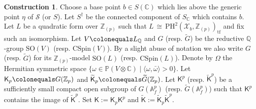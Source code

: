 \documentclass[11pt, letterpaper]{amsart}
\theoremstyle{plain}
\theoremstyle{definition}
\newtheorem{construction}[theorem]{Construction}
\newcommand{\IA}{\mathbb{A}}
\newcommand{\IC}{\mathbb{C}}
\newcommand{\IP}{\mathbb{P}}
\newcommand{\IQ}{\mathbb{Q}}
\newcommand{\IZ}{\mathbb{Z}}
\newcommand\iso{\,{\cong}\,}
\newcommand\tensor{{\otimes}}
\newcommand{\<}{\langle}
\renewcommand{\>}{\rangle}
\def\wt{\widetilde}
\newcommand{\w}{\omega}
\newcommand{\sX}{\mathcal{X}}
\newcommand{\PH}{\mathrm{PH}}
\newcommand{\sfK}{\mathsf{K}}
\newcommand{\sS}{\mathcal{S}}
\newcommand{\SO}{\mathrm{SO}}
\newcommand{\CSpin}{\mathrm{CSpin}}
\begin{document}
\begin{construction}
\label{const: sheaves on Sh}
Choose a base point $b \in S(\IC)$ which lies above the generic point $\eta$ of $\sS$ (or $S$). 
Let $S^\dagger$ be the connected component of $S_\IC$ which contains $b$. 
Let $L$ be a quadratic form over $\IZ_{(p)}$ such that $L \iso \PH^2(\sX_b, \IZ_{(p)})_{\mathrm{tf}}$ and fix such an isomorphism. Let $V \colonequals L_\IQ$ and $G$ (resp. $\wt{G}$) be the reductive $\IQ$-group $\SO(V)$ (resp. $\CSpin(V)$). 
By a slight abuse of notation we also write $G$ (resp. $\wt{G}$) for its $\IZ_{(p)}$-model $\SO(L)$ (resp. $\CSpin(L)$). 
Denote by $\Omega$ the Hermitian symmetric space $\{ \w \in \IP(V \tensor \IC) \mid \< \w, \bar{\w} \> > 0 \}$. 
Let $\sfK_p \colonequals G(\IZ_p)$ and $\wt{\sfK}_p \colonequals \wt{G}(\IZ_p)$. 
Let $\sfK^p$ (resp. $\wt{\sfK}^p$) be a sufficiently small compact open subgroup of $G(\IA_f^p)$ (resp. $\wt{G}(\IA^p_f)$) such that $\sfK^p$ contains the image of $\wt{\sfK}^p$. 
Set $\sfK := \sfK_p \sfK^p$ and $\wt{\sfK} := \wt{\sfK}_p \wt{\sfK}^p$. 


\end{construction}
\end{document}
